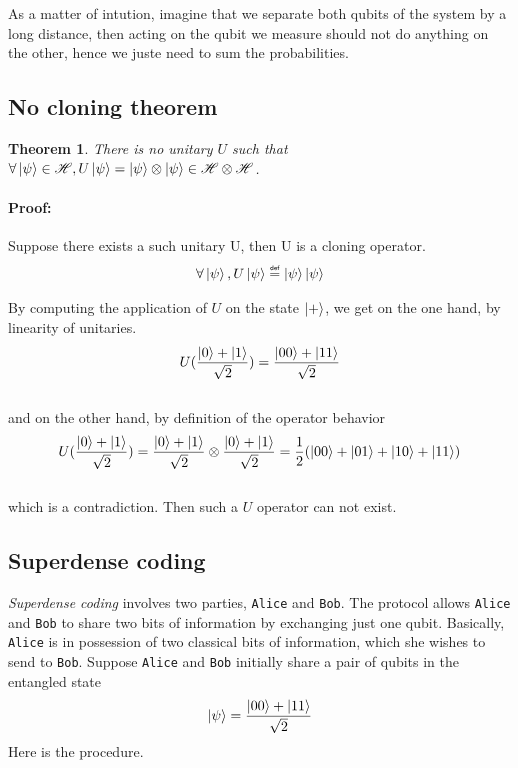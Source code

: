 \documentclass{article}
\newtheorem{theorem}{Theorem}
\newcommand\eqdef{\mathrel{\overset{\makebox[0pt]{\mbox{\normalfont\tiny\sffamily
def}}}{=}}}
\begin{document}
As a matter of intution, imagine that we separate both qubits of
the system by a long distance, then acting on the qubit we measure should not do
anything on the other, hence we juste need to sum the probabilities.

\subsection{No cloning theorem}
\begin{theorem}
    There is no unitary $U$ such that $\forall \ket{\psi} \in \mathscr{H},
    U\ket{\psi} = \ket{\psi} \otimes \ket{\psi} \in \mathscr{H} \otimes
    \mathscr{H}$.
\end{theorem}
\paragraph{Proof: }
Suppose there exists a such unitary U, then U is a cloning operator.
\begin{equation}
    \begin{aligned}
        \forall \ket{\psi}, U\ket{\psi} \eqdef \ket{\psi}\ket{\psi}
    \end{aligned}
\end{equation}

By computing the application of $U$ on the state $\ket{+}$, we get on the one
hand, by linearity of unitaries.
\begin{equation}
    U(\frac{\ket{0}+\ket{1}}{\sqrt{2}}) = \frac{\ket{00}+\ket{11}}{\sqrt{2}}
\end{equation}
\\
and on the other hand, by definition of the operator behavior
\begin{equation}
    U(\frac{\ket{0}+\ket{1}}{\sqrt{2}}) = \frac{\ket{0}+\ket{1}}{\sqrt{2}}
    \otimes \frac{\ket{0}+\ket{1}}{\sqrt{2}}
    =\frac{1}{2}(\ket{00}+\ket{01}+\ket{10}+\ket{11})
\end{equation}
\\
which is a contradiction. Then such a $U$ operator can not exist.

\subsection{Superdense coding}
\textit{Superdense coding} involves two parties, \texttt{Alice} and
\texttt{Bob}. The protocol allows \texttt{Alice} and \texttt{Bob} to share two
bits of information by exchanging just one qubit. Basically, \texttt{Alice} is
in possession of two classical bits of information, which she wishes to send to
\texttt{Bob}.
Suppose \texttt{Alice} and \texttt{Bob} initially share a pair of qubits in the
entangled state
\begin{equation}
    \ket{\psi} = \frac{\ket{00} + \ket{11}}{\sqrt{2}}
\end{equation}
Here is the procedure.
\end{document}
